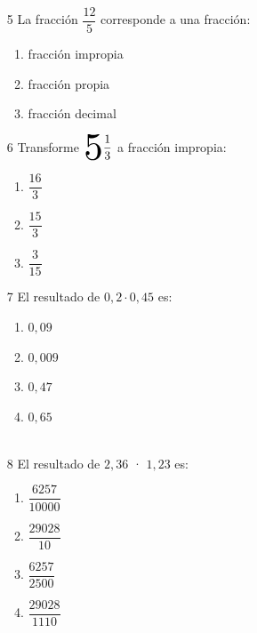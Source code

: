 \documentclass[12pt]{article}
\begin{document}
\begin{multicols}{2}
   \begin{enumerate}
   	\item [5] La fracción  $\dfrac{12}{5} $	corresponde a una fracción:
   	\begin{enumerate}
   		\item fracción impropia\\
   		\item fracción propia\\
   		\item fracción decimal\\
   	\end{enumerate}
   \end{enumerate}
   \begin{enumerate}
   	\item [6] Transforme $\scalerel{5}{\dfrac{1}{3}}$ a fracción impropia: 
   	   	\begin{enumerate}
   		\item $\dfrac{16}{3}$\\
   		\item $\dfrac{15}{3}$\\
   		\item $\dfrac{3}{15}$\\
     	\end{enumerate}
   \end{enumerate} 
\end{multicols}
\begin{multicols}{2}
	\begin{enumerate}
		\item [7]El resultado de $0,2 \cdot 0,45$	es:
		\begin{enumerate}
			\item $0,09$\\
			\item $0,009$\\
			\item $0,47$\\
			\item $0,65$\\ \ \\
		\end{enumerate}
	\end{enumerate}
\begin{enumerate}
	\item [8]El resultado de $2,36$ · $1,23$	es:
	\begin{enumerate}
	\item $\dfrac{6257}{10000}$\\
	\item $\dfrac{29028}{10}$\\
	\item $\dfrac{6257}{2500}$\\
	\item $\dfrac{29028}{1110}$\\ \ \\
	\end{enumerate}
\end{enumerate}
\end{multicols}
\end{document}
